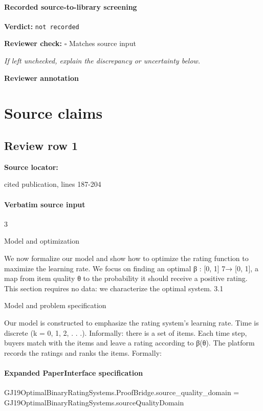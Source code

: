 \documentclass[10pt]{article}
\newcommand{\reviewerbox}{%
  \par\noindent\fbox{\parbox{0.96\linewidth}{\rule{0pt}{0.38in}}}\par
}
\newcommand{\reviewmatch}[1]{%
  \par\noindent\textbf{Reviewer check:} $\square$\; #1\par
  \noindent\emph{If left unchecked, explain the discrepancy or uncertainty below.}\par
}
\begin{document}
\paragraph{Recorded source-to-library screening}
\textbf{Verdict:} \texttt{not recorded}
\reviewmatch{Matches source input}
\noindent\textbf{Reviewer annotation}\par
\reviewerbox

\clearpage
\hypertarget{source-claim-d4f7ad79732f053c}{}
\hypertarget{source-section-f10b5f68e4acf3dc}{}
\section*{Source claims}
\subsection*{Review row 1}
\textbf{Source locator:} {\footnotesize\raggedright cited publication, lines 187-\allowbreak{}204\par}
\paragraph{Verbatim source input}
\begin{ReviewVerbatim}
3

Model and optimization

We now formalize our model and show how to optimize the rating function to maximize the learning
rate. We focus on finding an optimal β : [0, 1] 7→
[0, 1], a map from item quality θ to the probability
it should receive a positive rating. This section requires no data: we characterize the optimal system.
3.1

Model and problem specification

Our model is constructed to emphasize the rating system’s learning rate. Time is discrete (k =
0, 1, 2, . . .). Informally: there is a set of items. Each
time step, buyers match with the items and leave a
rating according to β(θ). The platform records the
ratings and ranks the items. Formally:
\end{ReviewVerbatim}


\paragraph{Expanded PaperInterface specification}
\begin{ReviewVerbatim}
GJ19OptimalBinaryRatingSystems.ProofBridge.source_quality_domain = GJ19OptimalBinaryRatingSystems.sourceQualityDomain
\end{ReviewVerbatim}
\end{document}
